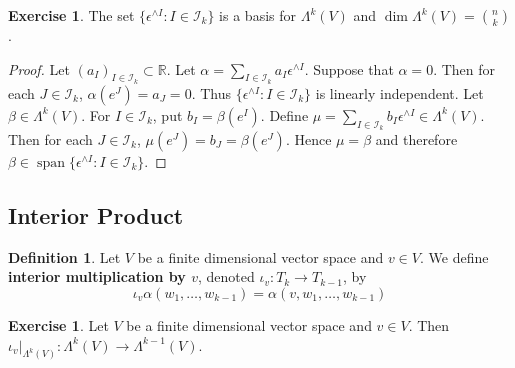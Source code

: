 \documentclass{book}
\theoremstyle{definition}
\newtheorem{defn}[definition]{Definition}
\newtheorem{ex}[definition]{Exercise}
\newcommand{\al}{\alpha}
\newcommand{\be}{\beta}
\newcommand{\ep}{\epsilon}
\newcommand{\Lam}{\Lambda}
\newcommand{\R}{\mathbb{R}}
\newcommand{\MI}{\mathcal{I}}
\DeclareMathOperator{\spn}{span}
\DeclareMathOperator*{\0}{\mbf{0}}
\DeclareMathOperator*{\1}{\mbf{1}}
\newcommand{\tbf}[1]{\textbf{#1}}
\begin{document}
	\begin{ex}
		The set $\{\ep^{\wedge I} : I \in \MI_k\}$ is a basis for $\Lam^k(V)$ and $\dim \Lam^k(V) = {n \choose k}$.
	\end{ex}

	\begin{proof}
		Let $(a_I)_{I \in \MI_k} \subset \R$. Let $\al = \sum\limits_{I \in \MI_k}a_I \ep^{\wedge I} $. Suppose that $\al = 0$. Then for each $J \in \MI_k$, $\al(e^J) = a_J = 0$. Thus $\{\ep^{\wedge I} : I \in \MI_k\}$ is linearly independent. Let $\be \in \Lam^k(V)$. For $I \in \MI_k$, put $b_I = \be(e^I)$. Define $\mu = \sum\limits_{I \in \MI_k} b_I\ep^{\wedge I} \in \Lam^k(V)$. Then for each $J \in \MI_k$, $\mu(e^J) = b_J = \be(e^J)$. Hence $\mu = \be$ and therefore $\be \in \spn \{\ep^{\wedge I} :I \in \MI_k\}$.
	\end{proof}














	
	\subsection{Interior Product}
	\begin{defn}
		Let $V$ be a finite dimensional vector space and $v \in V$. We define \tbf{interior multiplication by $v$}, denoted $\iota_v: T_k \rightarrow T_{k-1}$, by 
		$$\iota_v \al (w_1, \ldots, w_{k-1}) = \al(v, w_1, \ldots, w_{k-1})$$
	\end{defn}

	\begin{ex}
		Let $V$ be a finite dimensional vector space and $v \in V$. Then $\iota_v|_{\Lam^k(V)} : \Lam^k(V) \rightarrow \Lam^{k-1}(V)$.
	\end{ex}
	
\end{document}
